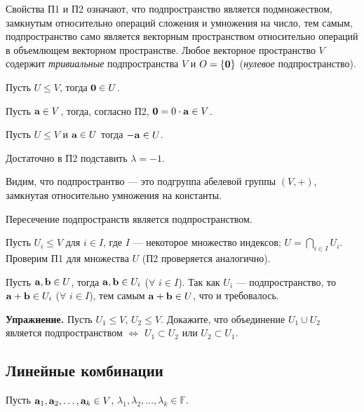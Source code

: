 Свойства П1 и П2 означают, что подпространство является подмножеством, замкнутым относительно
операций сложения и умножения на число, тем самым, подпространство само является векторным
пространством относительно операций в объемлющем векторном пространстве.
Любое векторное пространство $V$ содержит {\it тривиальные} подпространства $V$ и $O= \{ \mathbf{0} \}$ ({\it нулевое} подпространство).

\begin{predl}\label{nul_podprostr}
Пусть $U\leq V$, тогда $\mathbf{0} \in U$.
\end{predl}
\dok Пусть $\mathbf{a} \in V$, тогда, согласно П2, $\mathbf{0} =0\cdot \mathbf{a} \in V$.
\edok

\begin{predl}\label{minus_podprostr}
Пусть $U\leq V$ и $\mathbf{a}\in U$ тогда $-\mathbf{a} \in U$.
\end{predl}
\dok Достаточно в П2 подставить $\lambda = -1$.
\edok

\otstup
Видим, что подпространтво --- это подгруппа абелевой группы $(V, +)$, 
замкнутая относительно умножения на константы.


\begin{predl}\label{cap}
Пересечение подпространств является подпространством.
\end{predl}
\dok Пусть $U_i\leq V$ для $i\in I$, где $I$ --- некоторое множество индексов; $U=\bigcap\limits_{i\in I} U_i$.
Проверим П1 для множества $U$ (П2 проверяется аналогично).

Пусть $\mathbf{a}, \mathbf{b} \in U$, тогда $\mathbf{a}, \mathbf{b} \in U_i$ ($\forall$ $i\in I$).
Так как $U_i$ --- подпространство, то $\mathbf{a}+ \mathbf{b} \in U_i$ ($\forall$ $i\in I$), тем самым $\mathbf{a}+ \mathbf{b} \in U$, что и требовалось.
\edok

\otstup

{\bf Упражнение.}
Пусть $U_1\leq V$, $U_2\leq V$. Докажите, что объединение $U_1\cup U_2$ является подпространством
$\Leftrightarrow$ $U_1\subset U_2$ или $U_2\subset U_1$.



\subsection{Линейные комбинации}

Пусть $\mathbf{a}_1, \mathbf{a}_2, \ldots, \mathbf{a}_k \in V$,
$\lambda_1, \lambda_2, \ldots , \lambda_k\in \mathbb{F}$.


